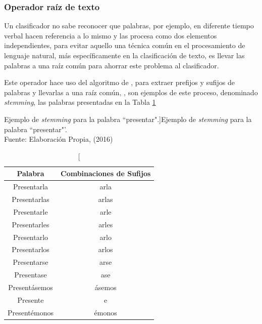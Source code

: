 \subsubsection*{Operador raíz de texto}
\label{subsubsec:6op}

Un clasificador no sabe reconocer que palabras, por ejemplo, en diferente tiempo verbal hacen referencia a lo mismo y las procesa como dos elementos independientes, para evitar aquello una técnica común en el procesamiento de lenguaje natural, más específicamente en la clasificación de texto, es llevar las palabras a una raíz común para ahorrar este problema al clasificador.

Este operador hace uso del algoritmo de \citep{Porter}, para extraer prefijos y sufijos de palabras y llevarlas a una raíz común, \citep{StemmingLema}, son ejemplos de este proceso, denominado \textit{stemming}, las palabras presentadas en la Tabla \ref{tab:ejstemming}

\begin{table}[H]
\centering
\caption[Ejemplo de \textit{stemming} para la palabra ``presentar".]{Ejemplo de \textit{stemming} para la palabra ``presentar"'.\\Fuente: Elaboración Propia, (2016)}
\label{tab:ejstemming}
\begin{tabular}{|c|c|}
\hline
\textbf{Palabra} & \textbf{Combinaciones de Sufijos} \\ \hline
Presentarla      & arla                              \\ \hline
Presentarlas     & arlas                             \\ \hline
Presentarle      & arle                              \\ \hline
Presentarles     & arles                             \\ \hline
Presentarlo      & arlo                              \\ \hline
Presentarlos     & arlos                             \\ \hline
Presentarse      & arse                              \\ \hline
Presentase       & ase                               \\ \hline
Presentásemos    & ásemos                            \\ \hline
Presente         & e                                 \\ \hline
Presentémonos    & émonos                            \\ \hline
\end{tabular}
\end{table}

